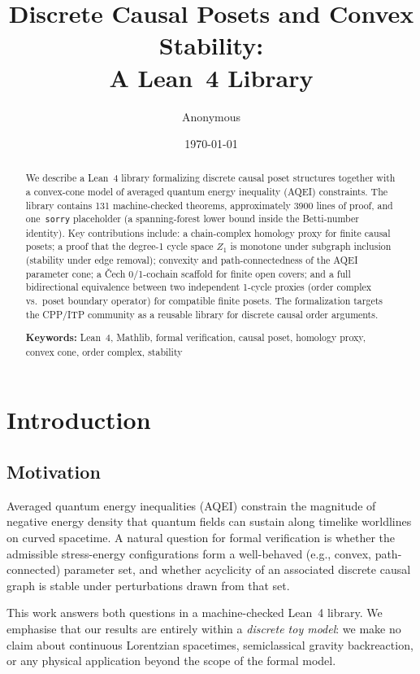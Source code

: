 \documentclass[12pt]{article}
\title{Discrete Causal Posets and Convex Stability:\\A Lean~4 Library}
\author{Anonymous}
\date{\today}
\begin{document}
\maketitle

\begin{abstract}
We describe a Lean~4 library formalizing discrete causal poset structures together
with a convex-cone model of averaged quantum energy inequality (AQEI) constraints.
The library contains 131\xspace machine-checked theorems, approximately 3900\xspace
lines of proof, and one~\texttt{sorry} placeholder (a spanning-forest lower bound
inside the Betti-number identity).
Key contributions include: a chain-complex homology proxy for finite causal posets;
a proof that the degree-1 cycle space $Z_1$ is monotone under subgraph inclusion
(stability under edge removal); convexity and path-connectedness of the AQEI
parameter cone; a Čech 0/1-cochain scaffold for finite open covers; and a full
bidirectional equivalence between two independent 1-cycle proxies (order complex
vs.\ poset boundary operator) for compatible finite posets.
The formalization targets the CPP/ITP community as a reusable library for
discrete causal order arguments.

\noindent \textbf{Keywords:} Lean~4, Mathlib, formal verification, causal poset,
homology proxy, convex cone, order complex, stability
\end{abstract}

\section{Introduction}

\subsection{Motivation}

Averaged quantum energy inequalities (AQEI) constrain the magnitude of negative
energy density that quantum fields can sustain along timelike worldlines on curved
spacetime\cite{fewster2012averaged}.  A natural question for formal verification
is whether the admissible stress-energy configurations form a well-behaved
(e.g., convex, path-connected) parameter set, and whether acyclicity of an
associated discrete causal graph is stable under perturbations drawn from that set.

This work answers both questions in a machine-checked Lean~4 library.  We
emphasise that our results are entirely within a \emph{discrete toy model}:
we make no claim about continuous Lorentzian spacetimes, semiclassical gravity
backreaction, or any physical application beyond the scope of the formal model.
\end{document}
